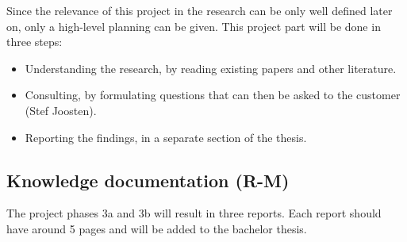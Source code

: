 Since the relevance of this project in the research can be only well defined later on, only a high-level planning can be given.
This project part will be done in three steps:
\begin{itemize}
	\item Understanding the research, by reading existing papers and other literature.
	\item Consulting, by formulating questions that can then be asked to the customer (Stef Joosten).
	\item Reporting the findings, in a separate section of the thesis.
\end{itemize}

\subsection{Knowledge documentation (R-M)}
The project phases 3a and 3b will result in three reports.
Each report should have around 5 pages and will be added to the bachelor thesis.

